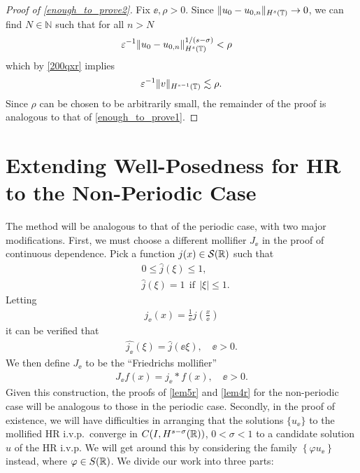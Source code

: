 \begin{proof}[Proof of \eqref{enough_to_prove2}]
Fix $\ee, \rho > 0$. Since $\|u_0 -
u_{0,n} \|_{H^s(\mathbb{T})} \to 0$, we
can find $N \in \mathbb{N}$ such that for all $n > N$
%
%
\begin{equation*}
\begin{split}
\varepsilon^{-1} \|u_0-u_{0,n}\|_{H^s(\mathbb{T})}^{1/(s-\sigma)}
& < \rho
\label{uniform_n}
\end{split}
\end{equation*}
%
%
which by \eqref{200qxr} implies
%
%
\begin{equation}
	\label{end-decay}
	\begin{split}
		\varepsilon^{-1} \|v\|_{H^{s-1}(\mathbb{T})} \lesssim \rho.
	\end{split}
\end{equation}
%
%
%
%
Since $\rho$ can be chosen to be arbitrarily small, the remainder of the 
proof is analogous to that of \eqref{enough_to_prove1}. 
\end{proof}
%
%
%
%
%
%
%
\section{Extending Well-Posedness for HR to the Non-Periodic Case}
\label{sec:defs}
The method will be analogous to that of the periodic case, with two major
modifications. First, we must choose a different mollifier $J_\ee$ in the
proof of continuous dependence. Pick a
function $j(x) \in \mathcal{S}(\mathbb{R})$ such that
\begin{equation*}
\begin{split}
& 0 \le \widehat{j}(\xi) \le 1,
\\
& \widehat{j}(\xi) = 1 \ \ \text{if} \ \ |\xi| \le 1.
\end{split}
\end{equation*}
Letting
\begin{equation*}
\begin{split}
j_\ee(x) = \frac{1}{\ee} j \left (\frac{x}{\ee} \right )
\end{split}
\end{equation*}
it can be verified that 
\begin{equation*}
\begin{split}
\widehat{j_\ee}(\xi) = \widehat{j }(\ee \xi), \quad \ee > 0.
\end{split}
\end{equation*}
We then define $J_\ee$ to be the ``Friedrichs mollifier''
\begin{equation*}
\begin{split}
J_\ee f(x) = j_\ee * f(x), \quad \ee>0.
\end{split}
\end{equation*}
Given this construction, the proofs of \cref{lem5r} and \cref{lem4r} for the non-periodic case will be
analogous to those in the periodic case.
Secondly, in the proof of existence, we will have difficulties in arranging
that the solutions $\{u_\ee\}$ to the mollified HR i.v.p.\ converge in $C(I,
H^{s- \sigma}(\mathbb{R}))$, $0 < \sigma < 1$ to a candidate solution $u$ of the HR
i.v.p. We will get around this by considering the family $\left\{ \varphi
u_\ee \right\}$ instead, where $\varphi \in S(\mathbb{R})$.
%
%
%
%
We divide our work into three parts:
